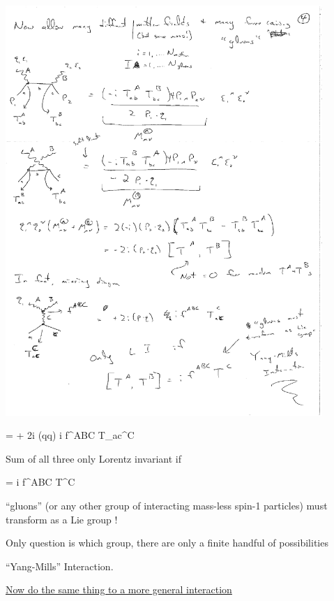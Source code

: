 {\begin{minipage}{0.4\textwidth}
\includegraphics[width=0.9\textwidth]{./comptonScattering7.pdf}
\end{minipage} %
\begin{minipage}{0.45\textwidth}
\be
= + 2i (q\cdot q) i f^{ABC} T_{ac}^C 
\ee
\end{minipage} %

Sum of all three only Lorentz invariant if 

\be
[T^A, T^B] = i f^{ABC} T^C
\ee


``gluons'' (or any other group of interacting mass-less spin-1 particles) must transform as a Lie group ! 

Only question is which group, there are only a finite handful of possibilities


``Yang-Mills'' Interaction. 

\lineacross


\underline{Now do the same thing to a more general interaction}


}
